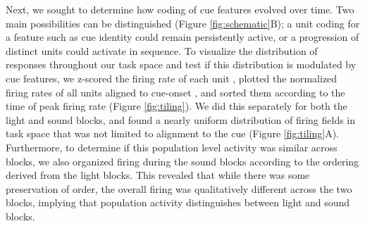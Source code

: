 \documentclass[11pt]{article}
\providecommand{\DIFadd}[1]{{\protect\color{red} \sf #1}} %
\providecommand{\DIFdel}[1]{} %
\providecommand{\DIFaddbegin}{} %
\providecommand{\DIFaddend}{} %
\providecommand{\DIFdelbegin}{} %
\providecommand{\DIFdelend}{} %
\newcommand{\DIFscaledelfig}{0.5}
\newlength{\DIFdelgraphicswidth} %
\newlength{\DIFdelgraphicsheight} %
\newcommand{\DIFaddincludegraphics}[2][]{{\color{red}\fbox{\DIFOincludegraphics[#1]{#2}}}} %
\newcommand{\DIFdelincludegraphics}[2][]{%
\sbox{\DIFdelgraphicsbox}{\DIFOincludegraphics[#1]{#2}}%
\settoboxwidth{\DIFdelgraphicswidth}{\DIFdelgraphicsbox} %
\settoboxtotalheight{\DIFdelgraphicsheight}{\DIFdelgraphicsbox} %
\scalebox{\DIFscaledelfig}{%
\parbox[b]{\DIFdelgraphicswidth}{\usebox{\DIFdelgraphicsbox}\\[-\baselineskip] \rule{\DIFdelgraphicswidth}{0em}}\llap{\resizebox{\DIFdelgraphicswidth}{\DIFdelgraphicsheight}{%
\setlength{\unitlength}{\DIFdelgraphicswidth}%
\begin{picture}(1,1)%
\thicklines\linethickness{2pt} %
{\color[rgb]{1,0,0}\put(0,0){\framebox(1,1){}}}%
{\color[rgb]{1,0,0}\put(0,0){\line( 1,1){1}}}%
{\color[rgb]{1,0,0}\put(0,1){\line(1,-1){1}}}%
\end{picture}%
}\hspace*{3pt}}} %
} %
\DeclareRobustCommand{\DIFaddbegin}{\DIFOaddbegin \let\includegraphics\DIFaddincludegraphics} %
\DeclareRobustCommand{\DIFaddend}{\DIFOaddend \let\includegraphics\DIFOincludegraphics} %
\DeclareRobustCommand{\DIFdelbegin}{\DIFOdelbegin \let\includegraphics\DIFdelincludegraphics} %
\DeclareRobustCommand{\DIFdelend}{\DIFOaddend \let\includegraphics\DIFOincludegraphics} %
\begin{document}
\DIFdelbegin \DIFdel{Given the varied time courses and response profiles of NAc units to various
aspects of the cue , the NAc may be computing a temporally evolving state value
signal (Pennartz., 2011). If this is the case, then the recruitment of NAc units should vary alongside changes in the environment. To look at }\DIFdelend \DIFaddbegin \DIFadd{Next, we sought to determine how coding of cue features evolved over
time. Two main possibilities can be distinguished (Figure \ref{fig:schematic}B);
a unit coding for a feature such as cue identity could remain
persistently active, or a progression of distinct units could activate
in sequence. To visualize }\DIFaddend the distribution of responses throughout our
task space and \DIFdelbegin \DIFdel{see }\DIFdelend \DIFaddbegin \DIFadd{test }\DIFaddend if this distribution is modulated by cue features,
we z-scored the firing rate of each unit\DIFdelbegin \DIFdel{and }\DIFdelend \DIFaddbegin \DIFadd{, }\DIFaddend plotted the normalized
firing rates of all units aligned to cue-onset\DIFaddbegin \DIFadd{, }\DIFaddend and sorted them
according to the time of peak firing rate (Figure
\ref{fig:tiling}). We did this separately for both the light and sound
blocks, and found a nearly uniform distribution of firing fields in
task space that was not limited to alignment to the cue (Figure
\ref{fig:tiling}A). Furthermore, to determine if this population level
activity was similar across blocks, we also organized firing during
the sound blocks according to the ordering derived from the light
blocks. This revealed that while there was some preservation of order,
the overall firing was qualitatively different across the two blocks,
implying that population activity distinguishes between light and
sound blocks. 
\DIFaddbegin 
\end{document}
